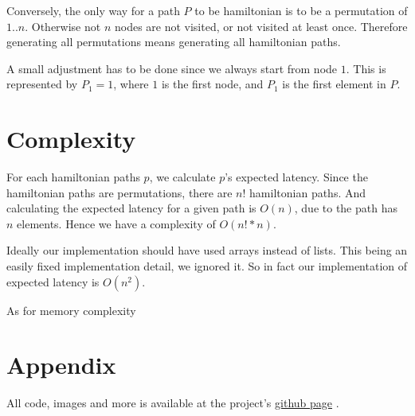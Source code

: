 \documentclass[a4paper,11pt]{article}
\begin{document}
Conversely, the only way for a path $P$ to be hamiltonian is to be a permutation of $1..n$.
Otherwise not $n$ nodes are not visited, or not visited at least once.
Therefore generating all permutations means generating all hamiltonian paths.

A small adjustment has to be done since we always start from node $1$.
This is represented by $P_1 = 1$, where $1$ is the first node, and $P_1$ is
the first element in $P$.

\section{Complexity}
For each hamiltonian paths $p$, we calculate $p$'s  expected latency.
Since the hamiltonian paths are permutations, there are $n!$ hamiltonian paths.
And calculating the expected latency for a given path is $O(n)$,
due to the path has $n$ elements.
Hence we have a complexity of $O(n!*n)$.

Ideally our implementation should have used arrays instead of lists.
This being an easily fixed implementation detail, we ignored it.
So in fact our implementation of expected latency is $O(n^2)$.

As for memory complexity

\section{Appendix}
All code, images and more is available at the project's \href{https://github.com/biforboman/Algorithms-TIN092}{github page} .
\end{document}
